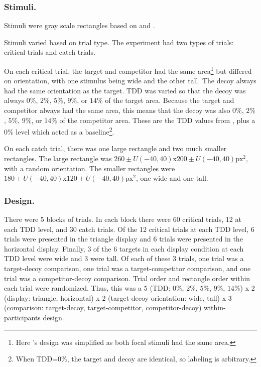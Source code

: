 \subsubsection{Stimuli.}
Stimuli were gray scale rectangles based on \textcite{trueblood2013not} and \textcite{spektorWhenGoodLooks2018b}. 

Stimuli varied based on trial type. The experiment had two types of trials: critical trials and catch trials.

On each critical trial, the target and competitor had the same area\footnote{Here \textcite{spektorWhenGoodLooks2018b}'s design was simplified as both focal stimuli had the same area.} but differed on orientation, with one stimulus being wide and the other tall. The decoy always had the same orientation as the target. TDD was varied so that the decoy was always $0\%$, $2\%$, $5\%$, $9\%$, or $14\%$ of the target area. Because the target and competitor always had the same area, this means that the decoy was also $0\%$, $2\%$, $5\%$, $9\%$, or $14\%$ of the competitor area. These are the TDD values from \textcite{spektorWhenGoodLooks2018b}, plus a $0\%$ level which acted as a baseline\footnote{When TDD=$0\%$, the target and decoy are identical, so labeling is arbitrary.}.

On each catch trial, there was one large rectangle and two much smaller rectangles. The large rectangle was $260 \pm U(-40, 40) \text{x} 200 \pm U(-40, 40) \text{px}^2$, with a random orientation. The smaller rectangles were $180 \pm U(-40, 40) \text{x} 120 \pm U(-40, 40) \text{px}^2$, one wide and one tall.

\subsubsection{Design.}
There were 5 blocks of trials. In each block there were 60 critical trials, 12 at each TDD level, and 30 catch trials. Of the 12 critical trials at each TDD level, 6 trials were presented in the triangle display and 6 trials were presented in the horizontal display. Finally, 3 of the 6 targets in each display condition at each TDD level were wide and 3 were tall. Of each of these 3 trials, one trial was a target-decoy comparison, one trial was a target-competitor comparison, and one trial was a competitor-decoy comparison. Trial order and rectangle order within each trial were randomized. Thus, this was a $5$ (TDD: $0\%$, $2\%$, $5\%$, $9\%$, $14\%$) x $2$ (display: triangle, horizontal) x $2$ (target-decoy orientation: wide, tall) x $3$ (comparison: target-decoy, target-competitor, competitor-decoy) within-participants design. 

